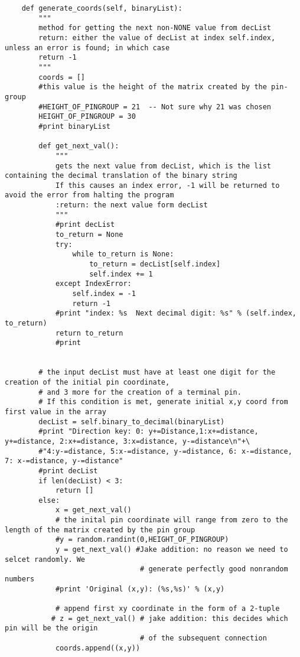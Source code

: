 \documentclass[a4paper]{article}
\begin{document}
\begin{verbatim}
    def generate_coords(self, binaryList):
        """
        method for getting the next non-NONE value from decList
        return: either the value of decList at index self.index, unless an error is found; in which case
        return -1
        """
        coords = []
        #this value is the height of the matrix created by the pin-group
        #HEIGHT_OF_PINGROUP = 21  -- Not sure why 21 was chosen
        HEIGHT_OF_PINGROUP = 30
        #print binaryList

        def get_next_val():
            """
            gets the next value from decList, which is the list containing the decimal translation of the binary string
            If this causes an index error, -1 will be returned to avoid the error from halting the program
            :return: the next value form decList
            """
            #print decList
            to_return = None
            try:
                while to_return is None:
                    to_return = decList[self.index]
                    self.index += 1
            except IndexError:
                self.index = -1
                return -1
            #print "index: %s  Next decimal digit: %s" % (self.index, to_return) 
            return to_return
            #print


        # the input decList must have at least one digit for the creation of the initial pin coordinate,
        # and 3 more for the creation of a terminal pin.
        # If this condition is met, generate initial x,y coord from first value in the array
        decList = self.binary_to_decimal(binaryList)
        #print "Direction key: 0: y+=Distance,1:x+=distance, y+=distance, 2:x+=distance, 3:x=distance, y-=distance\n"+\
        #"4:y-=distance, 5:x-=distance, y-=distance, 6: x-=distance, 7: x-=distance, y-=distance"
        #print decList
        if len(decList) < 3:
            return []
        else:
            x = get_next_val()
            # the inital pin coordinate will range from zero to the length of the matrix created by the pin group
            #y = random.randint(0,HEIGHT_OF_PINGROUP)
            y = get_next_val() #Jake addition: no reason we need to selcet randomly. We 
                                # generate perfectly good nonrandom numbers
            #print 'Original (x,y): (%s,%s)' % (x,y)

            # append first xy coordinate in the form of a 2-tuple
           # z = get_next_val() # jake addition: this decides which pin will be the origin
                                # of the subsequent connection
            coords.append((x,y))


\end{verbatim}
\end{document}

